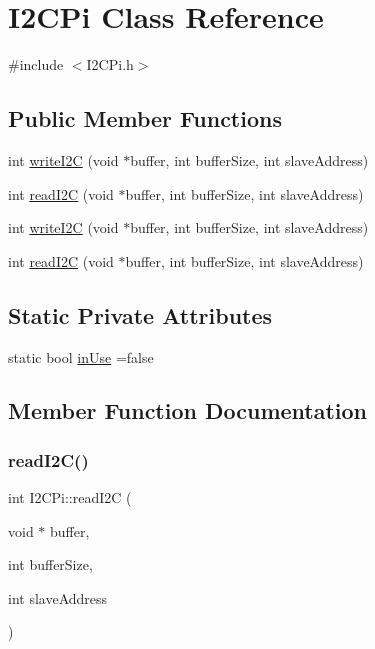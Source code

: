 \hypertarget{class_i2_c_pi}{}\section{I2\+C\+Pi Class Reference}
\label{class_i2_c_pi}


{\ttfamily \#include $<$I2\+C\+Pi.\+h$>$}

\subsection*{Public Member Functions}
\begin{DoxyCompactItemize}
\item 
int \mbox{\hyperlink{class_i2_c_pi_a4a7ad57107c689b1bb8ebaccd11856d5}{write\+I2C}} (void $\ast$buffer, int buffer\+Size, int slave\+Address)
\item 
int \mbox{\hyperlink{class_i2_c_pi_ae48a8e4619925b48657c92f2ee2449d3}{read\+I2C}} (void $\ast$buffer, int buffer\+Size, int slave\+Address)
\item 
int \mbox{\hyperlink{class_i2_c_pi_a4a7ad57107c689b1bb8ebaccd11856d5}{write\+I2C}} (void $\ast$buffer, int buffer\+Size, int slave\+Address)
\item 
int \mbox{\hyperlink{class_i2_c_pi_ae48a8e4619925b48657c92f2ee2449d3}{read\+I2C}} (void $\ast$buffer, int buffer\+Size, int slave\+Address)
\end{DoxyCompactItemize}
\subsection*{Static Private Attributes}
\begin{DoxyCompactItemize}
\item 
static bool \mbox{\hyperlink{class_i2_c_pi_a0bc9e6da78c59931828f30744527ff6c}{in\+Use}} =false
\end{DoxyCompactItemize}


\subsection{Member Function Documentation}
\mbox{\label{class_i2_c_pi_ae48a8e4619925b48657c92f2ee2449d3}} 
\subsubsection{\texorpdfstring{read\+I2\+C()}{readI2C()}\hspace{0.1cm}{\footnotesize\ttfamily [1/2]}}
{\footnotesize\ttfamily int I2\+C\+Pi\+::read\+I2C (\begin{DoxyParamCaption}\item[{void $\ast$}]{buffer,  }\item[{int}]{buffer\+Size,  }\item[{int}]{slave\+Address }\end{DoxyParamCaption})}

